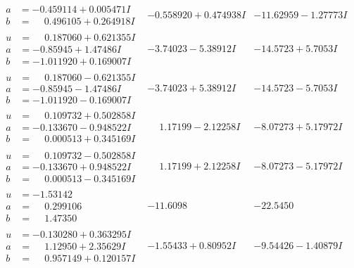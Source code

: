 \documentclass[1p]{elsarticle_modified}
\theoremstyle{definition}
\begin{document}
$$\begin{array}{c|c|c}
\begin{aligned}
a &= -0.459114 + 0.005471 I \\
b &= \phantom{-}0.496105 + 0.264918 I\end{aligned}
 & -0.558920 + 0.474938 I & -11.62959 - 1.27773 I \\ \hline\begin{aligned}
u &= \phantom{-}0.187060 + 0.621355 I \\
a &= -0.85945 + 1.47486 I \\
b &= -1.011920 + 0.169007 I\end{aligned}
 & -3.74023 - 5.38912 I & -14.5723 + 5.7053 I \\ \hline\begin{aligned}
u &= \phantom{-}0.187060 - 0.621355 I \\
a &= -0.85945 - 1.47486 I \\
b &= -1.011920 - 0.169007 I\end{aligned}
 & -3.74023 + 5.38912 I & -14.5723 - 5.7053 I \\ \hline\begin{aligned}
u &= \phantom{-}0.109732 + 0.502858 I \\
a &= -0.133670 - 0.948522 I \\
b &= \phantom{-}0.000513 + 0.345169 I\end{aligned}
 & \phantom{-}1.17199 - 2.12258 I & -8.07273 + 5.17972 I \\ \hline\begin{aligned}
u &= \phantom{-}0.109732 - 0.502858 I \\
a &= -0.133670 + 0.948522 I \\
b &= \phantom{-}0.000513 - 0.345169 I\end{aligned}
 & \phantom{-}1.17199 + 2.12258 I & -8.07273 - 5.17972 I \\ \hline\begin{aligned}
u &= -1.53142\phantom{ +0.000000I} \\
a &= \phantom{-}0.299106\phantom{ +0.000000I} \\
b &= \phantom{-}1.47350\phantom{ +0.000000I}\end{aligned}
 & -11.6098\phantom{ +0.000000I} & -22.5450\phantom{ +0.000000I} \\ \hline\begin{aligned}
u &= -0.130280 + 0.363295 I \\
a &= \phantom{-}1.12950 + 2.35629 I \\
b &= \phantom{-}0.957149 + 0.120157 I\end{aligned}
 & -1.55433 + 0.80952 I & -9.54426 - 1.40879 I \\ \hline\begin{aligned}

\end{aligned}
\end{array}$$
\end{document}
